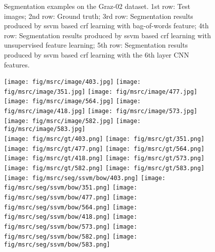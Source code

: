 \documentclass[10pt,3p]{elsarticle}
\newcommand{\ssvm}{{\sc ssvm}\xspace}
\newcommand{\crf}{{\sc crf}\xspace}
\begin{document}
\begin{figure}[t]
\caption{Segmentation examples on the Graz-02 dataset. 1st row: Test images; 2nd row: Ground truth; 
%
3rd row: Segmentation results produced by \ssvm based  \crf learning with bag-of-words feature;
4th row: Segmentation results produced by \ssvm based  \crf learning with unsupervised feature learning; 
5th row: Segmentation results produced by \ssvm based  \crf learning with the 6th layer CNN features. }
\label{fig:seg_graz02}     
\end{figure}\begin{figure}[!t]
\centering
%
%
	\texttt{[image: fig/msrc/image/403.jpg]}
     \texttt{[image: fig/msrc/image/351.jpg]}     
	\texttt{[image: fig/msrc/image/477.jpg]}
    \texttt{[image: fig/msrc/image/564.jpg]}
     \texttt{[image: fig/msrc/image/418.jpg]}
     \texttt{[image: fig/msrc/image/573.jpg]}   
     \texttt{[image: fig/msrc/image/582.jpg]} 
     \texttt{[image: fig/msrc/image/583.jpg]}\\
     
%
	\texttt{[image: fig/msrc/gt/403.png]}
     \texttt{[image: fig/msrc/gt/351.png]}     
	\texttt{[image: fig/msrc/gt/477.png]}
	\texttt{[image: fig/msrc/gt/564.png]}
     \texttt{[image: fig/msrc/gt/418.png]}
     \texttt{[image: fig/msrc/gt/573.png]}   
     \texttt{[image: fig/msrc/gt/582.png]} 
     \texttt{[image: fig/msrc/gt/583.png]}\\
     
%
%
%
%
%
%
%
%
     
%
	\texttt{[image: fig/msrc/seg/ssvm/bow/403.png]}
     \texttt{[image: fig/msrc/seg/ssvm/bow/351.png]}     
	\texttt{[image: fig/msrc/seg/ssvm/bow/477.png]}
    \texttt{[image: fig/msrc/seg/ssvm/bow/564.png]}
     \texttt{[image: fig/msrc/seg/ssvm/bow/418.png]}
     \texttt{[image: fig/msrc/seg/ssvm/bow/573.png]}   
     \texttt{[image: fig/msrc/seg/ssvm/bow/582.png]} 
     \texttt{[image: fig/msrc/seg/ssvm/bow/583.png]}\\
     

\end{figure}
\end{document}
